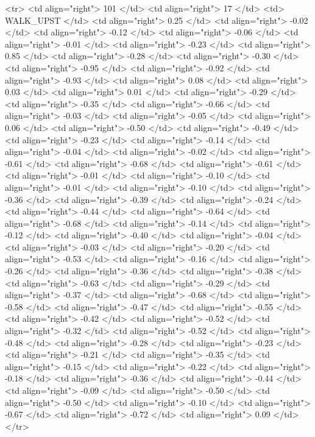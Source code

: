   <tr> <td align="right"> 101 </td> <td align="right">  17 </td> <td> WALK_UPST </td> <td align="right"> 0.25 </td> <td align="right"> -0.02 </td> <td align="right"> -0.12 </td> <td align="right"> -0.06 </td> <td align="right"> -0.01 </td> <td align="right"> -0.23 </td> <td align="right"> 0.85 </td> <td align="right"> -0.28 </td> <td align="right"> -0.30 </td> <td align="right"> -0.95 </td> <td align="right"> -0.92 </td> <td align="right"> -0.93 </td> <td align="right"> 0.08 </td> <td align="right"> 0.03 </td> <td align="right"> 0.01 </td> <td align="right"> -0.29 </td> <td align="right"> -0.35 </td> <td align="right"> -0.66 </td> <td align="right"> -0.03 </td> <td align="right"> -0.05 </td> <td align="right"> 0.06 </td> <td align="right"> -0.50 </td> <td align="right"> -0.49 </td> <td align="right"> -0.23 </td> <td align="right"> -0.14 </td> <td align="right"> -0.04 </td> <td align="right"> -0.02 </td> <td align="right"> -0.61 </td> <td align="right"> -0.68 </td> <td align="right"> -0.61 </td> <td align="right"> -0.01 </td> <td align="right"> -0.10 </td> <td align="right"> -0.01 </td> <td align="right"> -0.10 </td> <td align="right"> -0.36 </td> <td align="right"> -0.39 </td> <td align="right"> -0.24 </td> <td align="right"> -0.44 </td> <td align="right"> -0.64 </td> <td align="right"> -0.68 </td> <td align="right"> -0.14 </td> <td align="right"> -0.12 </td> <td align="right"> -0.40 </td> <td align="right"> -0.04 </td> <td align="right"> -0.03 </td> <td align="right"> -0.20 </td> <td align="right"> -0.53 </td> <td align="right"> -0.16 </td> <td align="right"> -0.26 </td> <td align="right"> -0.36 </td> <td align="right"> -0.38 </td> <td align="right"> -0.63 </td> <td align="right"> -0.29 </td> <td align="right"> -0.37 </td> <td align="right"> -0.68 </td> <td align="right"> -0.58 </td> <td align="right"> -0.47 </td> <td align="right"> -0.55 </td> <td align="right"> -0.42 </td> <td align="right"> -0.52 </td> <td align="right"> -0.32 </td> <td align="right"> -0.52 </td> <td align="right"> -0.48 </td> <td align="right"> -0.28 </td> <td align="right"> -0.23 </td> <td align="right"> -0.21 </td> <td align="right"> -0.35 </td> <td align="right"> -0.15 </td> <td align="right"> -0.22 </td> <td align="right"> -0.18 </td> <td align="right"> -0.36 </td> <td align="right"> -0.44 </td> <td align="right"> -0.09 </td> <td align="right"> -0.50 </td> <td align="right"> -0.50 </td> <td align="right"> -0.10 </td> <td align="right"> -0.67 </td> <td align="right"> -0.72 </td> <td align="right"> 0.09 </td> </tr>
